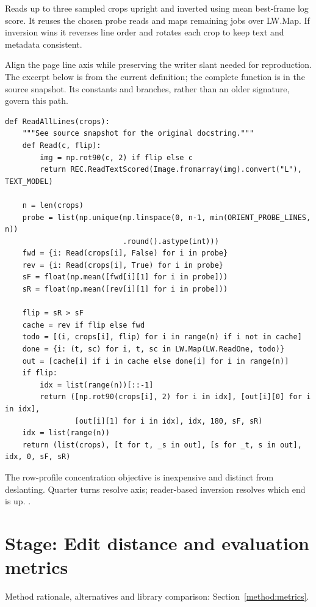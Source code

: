 Reads up to three sampled crops upright and inverted using mean best-frame log score. It reuses the chosen probe reads and maps remaining jobs over LW.Map. If inversion wins it reverses line order and rotates each crop to keep text and metadata consistent.


Align the page line axis while preserving the writer slant needed for reproduction. The excerpt below is from the current definition; the complete function is in the source snapshot. Its constants and branches, rather than an older signature, govern this path.


\begin{lstlisting}[style=plain]
def ReadAllLines(crops):
    """See source snapshot for the original docstring."""
    def Read(c, flip):
        img = np.rot90(c, 2) if flip else c
        return REC.ReadTextScored(Image.fromarray(img).convert("L"), TEXT_MODEL)

    n = len(crops)
    probe = list(np.unique(np.linspace(0, n-1, min(ORIENT_PROBE_LINES, n))
                           .round().astype(int)))
    fwd = {i: Read(crops[i], False) for i in probe}
    rev = {i: Read(crops[i], True) for i in probe}
    sF = float(np.mean([fwd[i][1] for i in probe]))
    sR = float(np.mean([rev[i][1] for i in probe]))

    flip = sR > sF
    cache = rev if flip else fwd
    todo = [(i, crops[i], flip) for i in range(n) if i not in cache]
    done = {i: (t, sc) for i, t, sc in LW.Map(LW.ReadOne, todo)}
    out = [cache[i] if i in cache else done[i] for i in range(n)]
    if flip:
        idx = list(range(n))[::-1]
        return ([np.rot90(crops[i], 2) for i in idx], [out[i][0] for i in idx],
                [out[i][1] for i in idx], idx, 180, sF, sR)
    idx = list(range(n))
    return (list(crops), [t for t, _s in out], [s for _t, s in out], idx, 0, sF, sR)
\end{lstlisting}
The row-profile concentration objective is inexpensive and distinct from deslanting. Quarter turns resolve axis; reader-based inversion resolves which end is up. \cite{postl1986,wolberg1990,opencvtransform,pillowops}.


\section*{Stage: Edit distance and evaluation metrics}
Method rationale, alternatives and library comparison: Section~\ref{method:metrics}.
